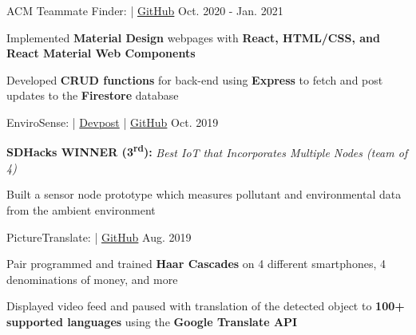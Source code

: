 

\begin{cventries}
	\cvproject
	{ACM Teammate Finder:  | \href{https://github.com/LelandTLong/ACM_Project}{\textcolor{awesome-skyblue}{\faGithub \enspace GitHub}}}
	{Oct. 2020 - Jan. 2021}
	{
		\begin{cvitems}
			\item Implemented \textbf{Material Design} webpages with \textbf{React, HTML/CSS, and React Material Web Components}
			\item Developed \textbf{CRUD functions} for back-end using \textbf{Express} to fetch and post updates to the \textbf{Firestore} database
		\end{cvitems}
	}

	\cvproject
	{EnviroSense:  | \href{https://devpost.com/software/envirosense}{\textcolor{awesome-skyblue}{Devpost}} | \href{https://github.com/jerukan/EnviroSense}{\textcolor{awesome-skyblue}{\faGithub \enspace GitHub}}}
	{Oct. 2019}
	{
		\begin{cvitems}
			\item \textbf{SDHacks WINNER (3\textsuperscript{rd}):} \textit{Best IoT that Incorporates Multiple Nodes (team of 4)}
			\item Built a sensor node prototype which measures pollutant and environmental data from the ambient environment
		\end{cvitems}
	}

	\cvproject
	{PictureTranslate:  |  \href{https://github.com/ucsd-cse-spis-2019/project-tristin-caroline}{\textcolor{awesome-skyblue}{\faGithub \enspace GitHub}}}
	{Aug. 2019}
	{
		\begin{cvitems}
			\item Pair programmed and trained \textbf{Haar Cascades} on 4 different smartphones, 4 denominations of money, and more
			\item Displayed video feed and paused with translation of the detected object to \textbf{100+ supported languages} using the \textbf{Google Translate API}
		\end{cvitems}
	}
\end{cventries}
